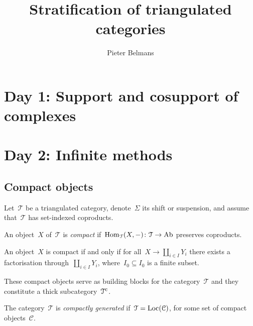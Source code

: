 \documentclass[10pt,a4paper]{article}
\title{Stratification of triangulated categories}
\author{Pieter Belmans}
\begin{document}
\maketitle

\tableofcontents

\clearpage

\section{Day 1: Support and cosupport of complexes}

\section{Day 2: Infinite methods}
\subsection{Compact objects}
Let~$\mathcal{T}$ be a triangulated category, denote~$\Sigma$ its shift or suspension, and assume that~$\mathcal{T}$ has set-indexed coproducts.
\begin{definition}
  An object~$X$ of~$\mathcal{T}$ is \emph{compact} if~$\operatorname{Hom}_{\mathcal{T}}(X,-)\colon\mathcal{T}\to\mathrm{Ab}$ preserves coproducts.
\end{definition}
\begin{lemma}
  An object~$X$ is compact if and only if for all~$X\to\coprod_{i\in I}Y_i$ there exists a factorisation through~$\coprod_{i\in I}Y_i$, where~$I_0\subseteq I_0$ is a finite subset.
\end{lemma}
\begin{remark}
  These compact objects serve as building blocks for the category~$\mathcal{T}$ and they constitute a thick subcategory~$\mathcal{T}^{\mathrm{c}}$.
\end{remark}
\begin{definition}
  The category~$\mathcal{T}$ is \emph{compactly generated} if~$\mathcal{T}=\operatorname{Loc}(\mathcal{C})$, for some set of compact objects~$\mathcal{C}$.
\end{definition}
\end{document}
